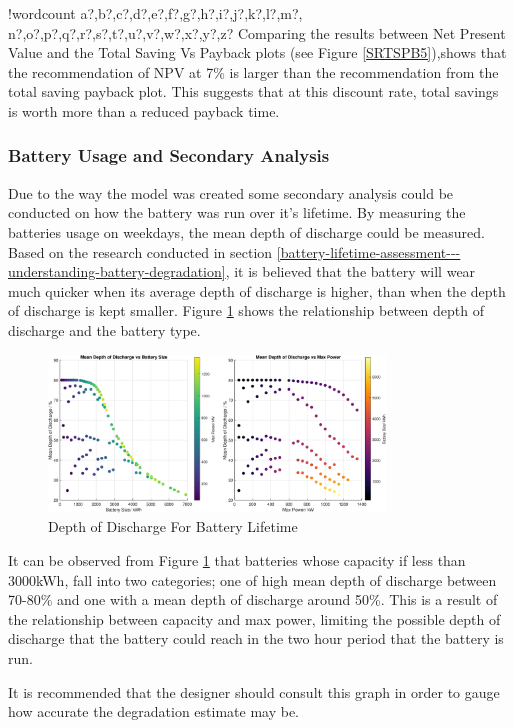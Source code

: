 \documentclass[fontsize=9.5pt]{extarticle}
\numberwithin{figure}{section} %
\newcounter{words}
\newenvironment{counted}{%
  \setcounter{words}{0}
  \SearchList!{wordcount}{\stepcounter{words}}
    {a?,b?,c?,d?,e?,f?,g?,h?,i?,j?,k?,l?,m?,
    n?,o?,p?,q?,r?,s?,t?,u?,v?,w?,x?,y?,z?}
  \UndoBoundary{'}
  \SearchOrder{p;}}{%
  \StopSearching}
\begin{document}
\begin{counted}
Comparing the results between Net Present Value and the Total Saving Vs
Payback plots (see Figure \ref{SRTSPB5}),shows that the recommendation
of NPV at 7\% is larger than the recommendation from the total saving
payback plot. This suggests that at this discount rate, total savings is
worth more than a reduced payback time.

\subsubsection{Battery Usage and Secondary
Analysis}\label{battery-usage-and-secondary-analysis}

Due to the way the model was created some secondary analysis could be
conducted on how the battery was run over it's lifetime. By measuring
the batteries usage on weekdays, the mean depth of discharge could be
measured. Based on the research conducted in section
\ref{battery-lifetime-assessment---understanding-battery-degradation},
it is believed that the battery will wear much quicker when its average
depth of discharge is higher, than when the depth of discharge is kept
smaller. Figure \ref{DOD1} shows the relationship between depth of
discharge and the battery type.

\begin{figure}[H]
 \centering
 \includegraphics[trim = 0 0 0 0, clip, width=0.8\textwidth]{DOD1.eps}
\caption{Depth of Discharge For Battery Lifetime}
 \label{DOD1}
 \end{figure}

It can be observed from Figure \ref{DOD1} that batteries whose capacity
if less than 3000kWh, fall into two categories; one of high mean depth
of discharge between 70-80\% and one with a mean depth of discharge
around 50\%. This is a result of the relationship between capacity and
max power, limiting the possible depth of discharge that the battery
could reach in the two hour period that the battery is run.

It is recommended that the designer should consult this graph in order
to gauge how accurate the degradation estimate may be.


\end{counted}
\end{document}
